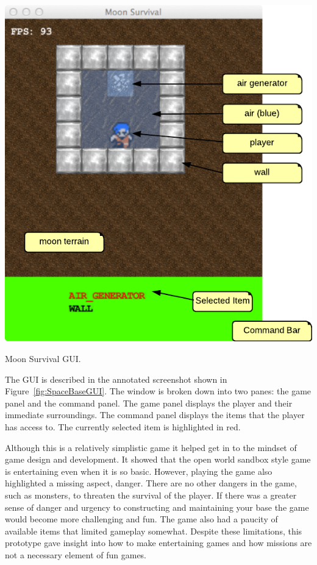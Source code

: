 \begin{marginfigure}
	\includegraphics{res/space_base_prototype/MoonSurvivalGUI.pdf}
	\caption[Moon Survival GUI]{Moon Survival GUI.}
	\label{fig:SpaceBaseGUI}
\end{marginfigure}

The GUI is described in the annotated screenshot shown in Figure~\ref{fig:SpaceBaseGUI}. The window is broken down into two panes: the game panel and the command panel. The game panel displays the player and their immediate surroundings. The command panel displays the items that the player has access to. The currently selected item is highlighted in red.

Although this is a relatively simplistic game it helped get in to the mindset of game design and development. It showed that the open world sandbox style game is entertaining even when it is so basic. However, playing the game also highlighted a missing aspect, danger. There are no other dangers in the game, such as monsters, to threaten the survival of the player. If there was a greater sense of danger and urgency to constructing and maintaining your base the game would become more challenging and fun. The game also had a paucity of available items that limited gameplay somewhat. Despite these limitations, this prototype gave insight into how to make entertaining games and how missions are not a necessary element of fun games. 
